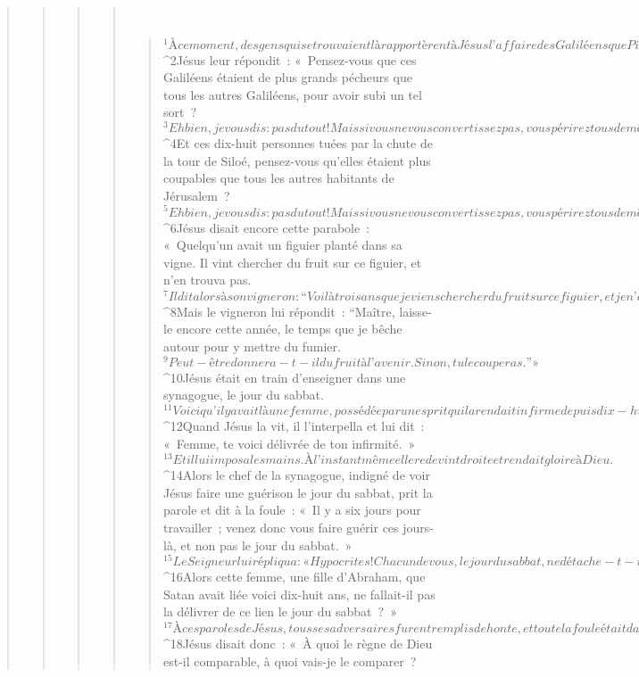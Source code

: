 \begin{verse}
\begin{verse}
\begin{verse}
\begin{verse}
         
      \bchapter{}
      \begin{verse}
${}^{1}À ce moment, des gens qui se trouvaient là rapportèrent à Jésus l’affaire des Galiléens que Pilate avait fait massacrer, mêlant leur sang à celui des sacrifices qu’ils offraient. 
${}^{2}Jésus leur répondit : « Pensez-vous que ces Galiléens étaient de plus grands pécheurs que tous les autres Galiléens, pour avoir subi un tel sort ? 
${}^{3}Eh bien, je vous dis : pas du tout ! Mais si vous ne vous convertissez pas, vous périrez tous de même. 
${}^{4}Et ces dix-huit personnes tuées par la chute de la tour de Siloé, pensez-vous qu’elles étaient plus coupables que tous les autres habitants de Jérusalem ? 
${}^{5}Eh bien, je vous dis : pas du tout ! Mais si vous ne vous convertissez pas, vous périrez tous de même. »
${}^{6}Jésus disait encore cette parabole : « Quelqu’un avait un figuier planté dans sa vigne. Il vint chercher du fruit sur ce figuier, et n’en trouva pas. 
${}^{7}Il dit alors à son vigneron : “Voilà trois ans que je viens chercher du fruit sur ce figuier, et je n’en trouve pas. Coupe-le. À quoi bon le laisser épuiser le sol ?” 
${}^{8}Mais le vigneron lui répondit : “Maître, laisse-le encore cette année, le temps que je bêche autour pour y mettre du fumier. 
${}^{9}Peut-être donnera-t-il du fruit à l’avenir. Sinon, tu le couperas.” »
${}^{10}Jésus était en train d’enseigner dans une synagogue, le jour du sabbat. 
${}^{11}Voici qu’il y avait là une femme, possédée par un esprit qui la rendait infirme depuis dix-huit ans ; elle était toute courbée et absolument incapable de se redresser. 
${}^{12}Quand Jésus la vit, il l’interpella et lui dit : « Femme, te voici délivrée de ton infirmité. » 
${}^{13}Et il lui imposa les mains. À l’instant même elle redevint droite et rendait gloire à Dieu. 
${}^{14}Alors le chef de la synagogue, indigné de voir Jésus faire une guérison le jour du sabbat, prit la parole et dit à la foule : « Il y a six jours pour travailler ; venez donc vous faire guérir ces jours-là, et non pas le jour du sabbat. » 
${}^{15}Le Seigneur lui répliqua : « Hypocrites ! Chacun de vous, le jour du sabbat, ne détache-t-il pas de la mangeoire son bœuf ou son âne pour le mener boire ? 
${}^{16}Alors cette femme, une fille d’Abraham, que Satan avait liée voici dix-huit ans, ne fallait-il pas la délivrer de ce lien le jour du sabbat ? » 
${}^{17}À ces paroles de Jésus, tous ses adversaires furent remplis de honte, et toute la foule était dans la joie à cause de toutes les actions éclatantes qu’il faisait.
${}^{18}Jésus disait donc : « À quoi le règne de Dieu est-il comparable, à quoi vais-je le comparer ? 

\end{verse}
\end{verse}
\end{verse}
\end{verse}
\end{verse}
